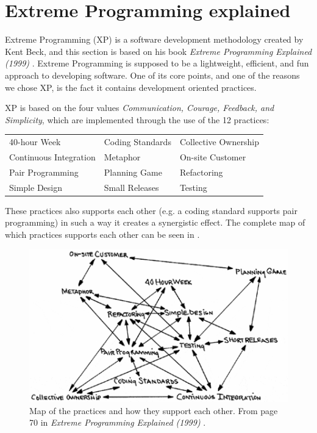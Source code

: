 \section{Extreme Programming explained}
Extreme Programming (XP) is a software development methodology created by Kent Beck, and this section is based on his book \textit{Extreme Programming Explained (1999)} \citep{xp:explained}. 
Extreme Programming is supposed to be a lightweight, efficient, and fun approach to developing software.
One of its core points, and one of the reasons we chose XP, is the fact it contains development oriented practices.

\noindent XP is based on the four values \textit{Communication, Courage, Feedback, and Simplicity}, which are implemented through the use of the 12 practices:

\begin{tabularx}{\textwidth}{X X X}
	40-hour Week				 & Coding Standards & Collective Ownership \\
	Continuous Integration	  & Metaphor         	 & On-site Customer     \\
	Pair Programming			& Planning Game		& Refactoring          \\
	Simple Design          		  & Small Releases   	& Testing             
\end{tabularx}

These practices also supports each other (e.g. a coding standard supports pair programming) in such a way it creates a synergistic effect.
The complete map of which practices supports each other can be seen in .
\begin{figure}[H]
	\centering
	\includegraphics[]{Images/xpPracticeSupport.png}
		\caption{Map of the practices and how they support each other.
			From page 70 in \textit{Extreme Programming Explained (1999)} \citep{xp:explained}. }
	\label{fig:practiceSupport}
\end{figure}



